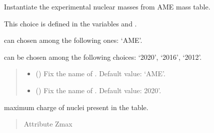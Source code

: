 \documentclass[letterpaper,10pt,english]{sphinxmanual}
\begin{document}
\begin{fulllineitems}
\label{\detokenize{source/api/setup_nuc_be_exp:nucleardatapy.nuc.setup_be_exp.setupBEExp}}
\pysigstartsignatures
{}
\pysigstopsignatures
\sphinxAtStartPar
Instantiate the experimental nuclear masses from AME mass table.

\sphinxAtStartPar
This choice is defined in the variables  and .

\sphinxAtStartPar
{} can chosen among the following ones: ‘AME’.

\sphinxAtStartPar
{} can be chosen among the following choices: ‘2020’, ‘2016’, ‘2012’.
\begin{quote}\begin{description}
\begin{itemize}
\item {} 
\sphinxAtStartPar
{} (\sphinxstyleliteralemphasis{\sphinxupquote{, }}) \textendash{} Fix the name of . Default value: ‘AME’.

\item {} 
\sphinxAtStartPar
{} (\sphinxstyleliteralemphasis{\sphinxupquote{, }}) \textendash{} Fix the name of . Default value: 2020’.

\end{itemize}

\end{description}\end{quote}

\sphinxAtStartPar
{}

\begin{fulllineitems}
\label{\detokenize{source/api/setup_nuc_be_exp:nucleardatapy.nuc.setup_be_exp.setupBEExp.Zmax}}
\pysigstartsignatures
{}
\pysigstopsignatures
\sphinxAtStartPar
maximum charge of nuclei present in the table.
\begin{quote}\begin{description}
\sphinxAtStartPar
Attribute Zmax


\end{description}
\end{quote}
\end{fulllineitems}
\end{fulllineitems}
\end{document}
